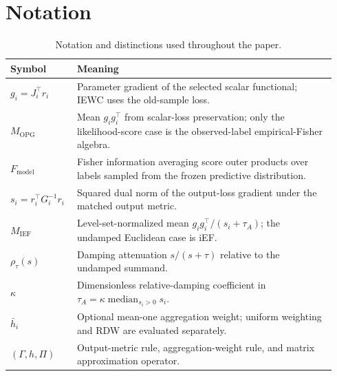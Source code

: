 \section{Notation}
\label{app:notation}

\begin{table}[H]
\caption{Notation and distinctions used throughout the paper.}
\label{tab:notation}
\centering
\small
\begin{tabular}{@{}p{0.18\linewidth}p{0.76\linewidth}@{}}
\toprule
Symbol & Meaning \\
\midrule
$g_i=J_i^\top r_i$ & Parameter gradient of the selected scalar functional; IEWC uses the old-sample loss. \\
$M_{\mathrm{OPG}}$ & Mean $g_i g_i^\top$ from scalar-loss preservation; only the likelihood-score case is the observed-label empirical-Fisher algebra. \\
$F_{\mathrm{model}}$ & Fisher information averaging score outer products over labels sampled from the frozen predictive distribution. \\
$s_i=r_i^\top G_i^{-1}r_i$ & Squared dual norm of the output-loss gradient under the matched output metric. \\
$M_{\mathrm{IEF}}$ & Level-set-normalized mean $g_i g_i^\top/(s_i+\tau_A)$; the undamped Euclidean case is iEF. \\
$\rho_\tau(s)$ & Damping attenuation $s/(s+\tau)$ relative to the undamped summand. \\
$\kappa$ & Dimensionless relative-damping coefficient in $\tau_A=\kappa\operatorname{median}_{s_i>0}s_i$. \\
$\bar h_i$ & Optional mean-one aggregation weight; uniform weighting and RDW are evaluated separately. \\
$(\Gamma,h,\Pi)$ & Output-metric rule, aggregation-weight rule, and matrix approximation operator. \\
\bottomrule
\end{tabular}
\end{table}
